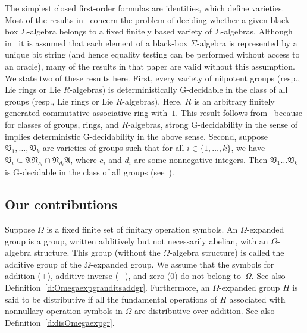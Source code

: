 \documentclass{jgcc}
\newcommand{\cl}{\mathfrak}
\begin{document}
The simplest closed first-order formulas are identities,
which define varieties. Most of the results in~\cite{Ano02}
concern the problem of deciding whether a given black-box
$\Sigma$-algebra belongs to a fixed finitely based variety
of $\Sigma$-algebras. Although in~\cite{Ano02} it is assumed
that each element of a black-box $\Sigma$-algebra is
represented by a unique bit string (and hence equality
testing can be performed without access to an oracle), many
of the results in that paper are valid without this
assumption. We state two of these results here. First, every
variety of nilpotent groups (resp., Lie rings or Lie
$R$-algebras) is deterministically G-decidable in the class
of all groups (resp., Lie rings or Lie $R$-algebras). Here,
$R$ is an arbitrary finitely generated commutative
associative ring with~$1$. This result follows
from~\cite[Corollary~5.1]{Ano02} because for classes of
groups, rings, and $R$-algebras, strong G-decidability in
the sense of~\cite{Ano02} implies deterministic
G-decidability in the above sense. Second, suppose $\cl
V_1,\dots,\cl V_k$ are varieties of groups such that for all
$i\in\{1,\dots,k\}$, we have $\cl V_i\subseteq\cl A\cl
N_{c_i}\cap\cl N_{d_i}\cl A$, where $c_i$ and $d_i$ are some
nonnegative integers. Then $\cl V_1\dots\cl V_k$ is
G-decidable in the class of all groups
(see~\cite[Proposition~5.2]{Ano02}).

\subsection{Our contributions}
\label{ss:ourcontrib}

Suppose $\Omega$ is a fixed finite set of finitary operation
symbols. An $\Omega$-expanded group is a group, written
additively but not necessarily abelian, with an
$\Omega$-algebra structure. This group (without the
$\Omega$-algebra structure) is called the additive group of
the $\Omega$-expanded group. We assume that the symbols for
addition ($+$), additive inverse ($-$), and zero ($0$) do
not belong to~$\Omega$. See also
Definition~\ref{d:Omegaexpgranditsaddgr}. Furthermore, an
$\Omega$-expanded group $H$ is said to be distributive if
all the fundamental operations of $H$ associated with
nonnullary operation symbols in $\Omega$ are distributive
over addition. See also Definition~\ref{d:disOmegaexpgr}.
\end{document}
